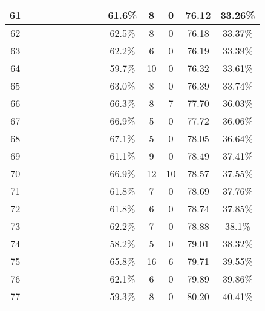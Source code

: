\begin{longtable}{|c|c|c|c|c|c|c|c|c|c|c|c|c|c|}
61 &  \x    & \x    & \x    & \x    &       & \x\m  &       & \x\m  & 61.6\% &  8  & 0  & 76.12 & 33.26\% \\ \hline
62 &  \x    & \x    & \x    & \x    &       &       & \x\m  &       & 62.5\% &  8  & 0  & 76.18 & 33.37\% \\ \hline
63 &  \x    & \x    & \x    & \x    & \x    & \x\m  &       & \x\m  & 62.2\% &  6  & 0  & 76.19 & 33.39\% \\ \hline
64 &  \x    & \x    & \x    &       &       &       &       &       & 59.7\% &  10 & 0  & 76.32 & 33.61\% \\ \hline
65 &  \x    & \x    & \x    &       & \x    &       & \x\m  &       & 63.0\% &  8  & 0  & 76.39 & 33.74\% \\ \hline
66 &  \x    & \x    & \x    & \x    & \x\m  &       & \x\m  &       & 66.3\% &  8  & 7  & 77.70 & 36.03\% \\ \hline
67 &  \x    & \x    & \x    &       & \x\m  & \x    & \x    &       & 66.9\% &  5  & 0  & 77.72 & 36.06\% \\ \hline
68 &  \x    & \x    & \x    & \x    & \x\m  &       & \x    &       & 67.1\% &  5  & 0  & 78.05 & 36.64\% \\ \hline
69 &  \x    & \x    & \x    & \x    &       & \x\m  &       & \x    & 61.1\% &  9  & 0  & 78.49 & 37.41\% \\ \hline
70 &  \x    & \x    &       & \x    & \x\m  & \x\m  &       & \x\m  & 66.9\% &  12 & 10 & 78.57 & 37.55\% \\ \hline
71 &  \x    & \x    & \x    & \x    & \x    &       &       & \x    & 61.8\% &  7  & 0  & 78.69 & 37.76\% \\ \hline
72 &  \x    & \x    & \x    &       & \x    & \x\m  &       & \x\m  & 61.8\% &  6  & 0  & 78.74 & 37.85\% \\ \hline
73 &  \x    & \x    & \x    &       & \x    & \x\m  &       &       & 62.2\% &  7  & 0  & 78.88 & 38.1\% \\ \hline
74 &  \x    & \x    &       & \x    & \x    & \x    &       &       & 58.2\% &  5  & 0  & 79.01 & 38.32\% \\ \hline
75 &  \x    & \x    &       &       & \x\m  & \x\m  & \x\m  &       & 65.8\% &  16 & 6  & 79.71 & 39.55\% \\ \hline
76 &  \x    & \x    & \x    & \x    &       &       & \x    &       & 62.1\% &  6  & 0  & 79.89 & 39.86\% \\ \hline
77 &  \x    & \x    & \x    &       &       & \x\m  &       & \x\m  & 59.3\% &  8  & 0  & 80.20 & 40.41\% \\ \hline

\end{longtable}
